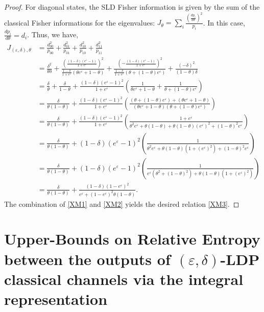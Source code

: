 \documentclass[onecolumn,ldraftcls, 11pt]{IEEEtran}
\newcommand{\nn}{\nonumber}
\newcommand{\eps}{\varepsilon}
\begin{document}
\begin{proof}
For diagonal states, the SLD Fisher information is given by the sum of the classical Fisher informations for the eigenvalues: $J_\theta = \sum_i \frac{(\frac{d p_i}{d\theta})^2}{p_i}$. In this case, $\frac{d p_i}{d\theta} = d_i$. Thus, we have,
\begin{align}
J_{(\eps,\delta),\theta} &= \frac{d_{00}^2}{p_{00}} + \frac{d_{01}^2}{p_{01}} + \frac{d_{10}^2}{p_{10}} + \frac{d_{11}^2}{p_{11}} \nn\\
&= \frac{\delta^2}{\theta\delta} + \frac{\left(\frac{(1-\delta)(e^\eps-1)}{1+e^\eps}\right)^2}{\frac{1-\delta}{1+e^\eps}(\theta e^\eps + 1-\theta)} + \frac{\left(-\frac{(1-\delta)(e^\eps-1)}{1+e^\eps}\right)^2}{\frac{1-\delta}{1+e^\eps}(\theta + (1-\theta)e^\eps)} + \frac{(-\delta)^2}{(1-\theta)\delta} \nn\\
&= \frac{\delta}{\theta} + \frac{\delta}{1-\theta} + \frac{(1-\delta)(e^\eps-1)^2}{1+e^\eps} \left( \frac{1}{\theta e^\eps + 1-\theta} + \frac{1}{\theta + (1-\theta)e^\eps} \right) \\
&= \frac{\delta}{\theta(1-\theta)} + \frac{(1-\delta)(e^\eps-1)^2}{1+e^\eps} \left( \frac{(\theta + (1-\theta)e^\eps) + (\theta e^\eps + 1-\theta)}{(\theta e^\eps + 1-\theta)(\theta + (1-\theta)e^\eps)} \right) \nn\\
&= \frac{\delta}{\theta(1-\theta)} + \frac{(1-\delta)(e^\eps-1)^2}{1+e^\eps} \left( \frac{1+e^\eps}{\theta^2 e^\eps + \theta(1-\theta) + \theta(1-\theta)(e^\eps)^2 + (1-\theta)^2 e^\eps} \right) \nn\\
&= \frac{\delta}{\theta(1-\theta)} + (1-\delta)(e^\eps-1)^2 \left( \frac{1}{\theta^2 e^\eps + \theta(1-\theta)(1+(e^\eps)^2) + (1-\theta)^2 e^\eps} \right) \nn\\
&= \frac{\delta}{\theta(1-\theta)} + (1-\delta)(e^\eps-1)^2 \left( \frac{1}{e^\eps(\theta^2+(1-\theta)^2) + \theta(1-\theta)(1+(e^\eps)^2)} \right) \nn\\
&= \frac{\delta}{\theta(1-\theta)} + \frac{(1-\delta)(1-e^\eps)^2}{e^\eps + (1-e^\eps)^2 \theta(1-\theta)}.
\label{XM2}
\end{align}
The combination of 
\eqref{XM1} and \eqref{XM2} yields the desired relation 
\eqref{XM3}.
 \end{proof}



\section{Upper-Bounds on Relative Entropy between the outputs of $(\eps,\delta)$-LDP classical channels via the integral representation}\label{sec_LDP_channel}
\end{document}
